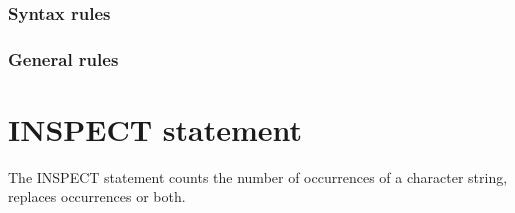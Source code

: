 \begin{syntax}[\miscextcolour]
\end{syntax}

\subsubsection{Syntax rules}

\subsubsection{General rules}

\section{INSPECT statement}

The INSPECT statement counts the number of occurrences of a character string, replaces occurrences or both.

\begin{syntax}
  \begin{1=}
    \identifier \\
    \literal \\
    \functionname
  \end{1=}
  \begin{1=}
    \begin{0-1}
    \end{0-1} \\

     \\
  \end{1=}
\end{syntax}

